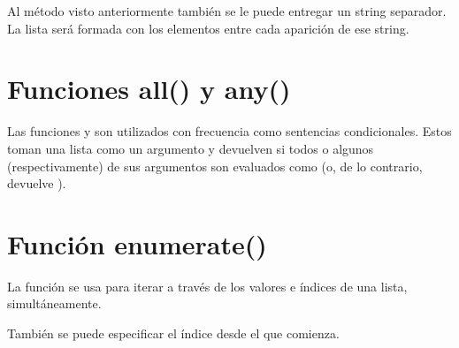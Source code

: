Al método  visto anteriormente también se le puede entregar un string separador.
La lista será formada con los elementos entre cada aparición de ese string.


\section{Funciones all() y any()}

Las funciones  y  son utilizados con frecuencia como sentencias condicionales.
Estos toman una lista como un argumento y devuelven  si todos o algunos (respectivamente) de sus argumentos son evaluados como  (o, de lo contrario, devuelve ).



\section{Función enumerate()}

La función  se usa para iterar a través de los valores e índices de una lista, simultáneamente.


También se puede especificar el índice desde el que comienza.


\clearpage